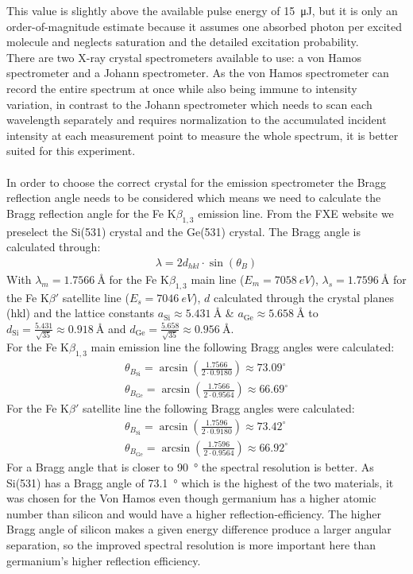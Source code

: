 \documentclass[10pt,a4paper, bibliography=totoc]{scrartcl}
\begin{document}
This value is slightly above the available pulse energy of \qty{15}{\micro\J}, but it is only an order-of-magnitude estimate because it assumes one absorbed photon per excited molecule and neglects saturation and the detailed excitation probability.\\
There are two X-ray crystal spectrometers available to use: a von Hamos spectrometer and a Johann spectrometer. As the von Hamos spectrometer can record the entire spectrum at once while also being immune to intensity variation, in contrast to the Johann spectrometer which needs to scan each wavelength separately and requires normalization to the accumulated incident intensity at each measurement point to measure the whole spectrum, it is better suited for this experiment.\\\\
In order to choose the correct crystal for the emission spectrometer the Bragg reflection angle needs to be considered which means we need to calculate the Bragg reflection angle for the Fe K$\beta_{1,3}$ emission line. From the FXE website \cite{5} we preselect the Si(531) crystal and the Ge(531) crystal. The Bragg angle is calculated through:
\begin{align}
	\lambda = 2d_{hkl}\cdot\sin(\theta_B)
\end{align}
With $\lambda_m=\qty{1.7566}{\angstrom}$ for the Fe K$\beta_{1,3}$ main line ($E_m=\qty{7058}{eV}$), $\lambda_s=\qty{1.7596}{\angstrom}$ for the Fe K$\beta'$ satellite line ($E_s=\qty{7046}{eV}$), $d$ calculated through the crystal planes (hkl) and the lattice constants $a_{\text{Si}}\approx\qty{5.431}{\angstrom}$ \& $a_{\text{Ge}}\approx\qty{5.658}{\angstrom}$ to $d_\text{Si}=\frac{5.431}{\sqrt{35}}\approx\qty{0.918}{\angstrom}$ and $d_\text{Ge}=\frac{5.658}{\sqrt{35}}\approx\qty{0.956}{\angstrom}$.\\
For the Fe K$\beta_{1,3}$ main emission line the following Bragg angles were calculated:
\begin{align}
	\theta_{B_{\text{Si}}} = \arcsin\left(\frac{1.7566}{2 \cdot 0.9180}\right) \approx 73.09^\circ\\
	\theta_{B_{\text{Ge}}} = \arcsin\left(\frac{1.7566}{2 \cdot 0.9564}\right) \approx 66.69^\circ
\end{align}
For the Fe K$\beta'$ satellite line the following Bragg angles were calculated:
\begin{align}
	\theta_{B_{\text{Si}}} = \arcsin\left(\frac{1.7596}{2 \cdot 0.9180}\right) \approx 73.42^\circ\\
	\theta_{B_{\text{Ge}}} = \arcsin\left(\frac{1.7596}{2 \cdot 0.9564}\right) \approx 66.92^\circ
\end{align}
For a Bragg angle that is closer to \qty{90}{\degree} the spectral resolution is better. As Si(531) has a Bragg angle of \qty{73.1}{\degree} which is the highest of the two materials, it was chosen for the Von Hamos even though germanium has a higher atomic number than silicon and would have a higher reflection-efficiency. The higher Bragg angle of silicon makes a given energy difference produce a larger angular separation, so the improved spectral resolution is more important here than germanium's higher reflection efficiency.
\end{document}
